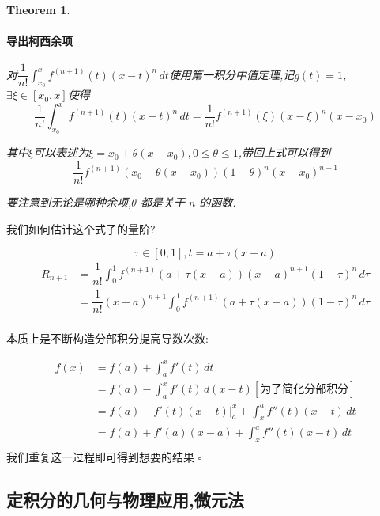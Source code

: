 \documentclass[11pt,hyperref,a4paper,UTF8]{ctexart}
\newtheorem{theorem}{Theorem}[subsection]
\newenvironment{cproof}{%
\heiti{证明}\kaishu
}{%
  \hfill $\square$
  \par\bigskip
}
\begin{document}
\begin{CJK}{UTF8}{gkai}
\begin{theorem}
\paragraph{导出柯西余项\\}

对$ \dfrac{1}{n!}\int_{x_0}^{x} f^{(n + 1)}(t) (x - t)^n\,dt$使用第一积分中值定理,记$g(t) = 1$, $\exists \xi \in [x_0,x]$使得
\[\dfrac{1}{n!}\int_{x_0}^{x} f^{(n + 1)}(t) (x - t)^n\,dt = \dfrac{1}{n!}f^{(n + 1)}(\xi) (x - \xi)^n (x - x_0)\]

其中$\xi$可以表述为$\xi = x_0 + \theta (x - x_0),0\leq \theta \leq 1$,带回上式可以得到
\[\dfrac{1}{n!} f^{(n + 1)}(x_0 + \theta(x - x_0))(1 - \theta)^n (x - x_0)^{n + 1}\]

要注意到无论是哪种余项,$\theta$ 都是关于 $n$ 的函数.
\end{theorem}

我们如何估计这个式子的量阶?

\[\tau \in [ 0 , 1], t  = a + \tau ( x - a)\]
\[
\begin{aligned}  
  R_{n + 1}  &= \dfrac{1}{n!} \int_{0}^{1} f^{(n + 1)} (a + \tau(x -a )) (x - a)^{n + 1} (1 - \tau)^n \, d\tau\\
  &= \dfrac{1}{n!} (x - a)^{n + 1} \int_{0}^{1} f^{(n + 1)} (a + \tau(x -a )) (1 - \tau)^n \, d\tau\\
\end{aligned}  
\]

\begin{cproof}
本质上是不断构造分部积分提高导数次数:

\[
\begin{aligned}  
  f(x) &= f(a) + \int_{a}^{x}f'(t)\,dt\\
  &= f(a) - \int_{a}^{x}f'(t)\,d(x - t) [\text{为了简化分部积分}]\\
  &= f(a) - f'(t)(x - t)|_{a}^x + \int_{x}^{a} f''(t) (x- t)\, dt\\
  &= f(a) + f'(a) (x - a)+ \int_{x}^{a} f''(t) (x- t)\, dt\\
\end{aligned}  
\]
我们重复这一过程即可得到想要的结果
\end{cproof}

\subsection{定积分的几何与物理应用,微元法}

\end{CJK}
\end{document}
